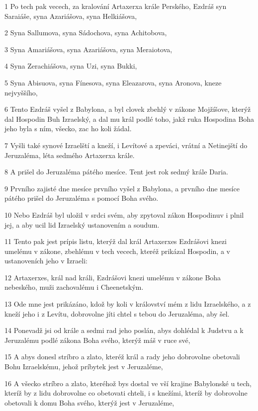 \par 1 Po tech pak vecech, za kralování Artaxerxa krále Perského, Ezdráš syn Saraiáše, syna Azariášova, syna Helkiášova,
\par 2 Syna Sallumova, syna Sádochova, syna Achitobova,
\par 3 Syna Amariášova, syna Azariášova, syna Meraiotova,
\par 4 Syna Zerachiášova, syna Uzi, syna Bukki,
\par 5 Syna Abisuova, syna Fínesova, syna Eleazarova, syna Aronova, kneze nejvyššího,
\par 6 Tento Ezdráš vyšel z Babylona, a byl clovek zbehlý v zákone Mojžíšove, kterýž dal Hospodin Buh Izraelský, a dal mu král podlé toho, jakž ruka Hospodina Boha jeho byla s ním, všecko, zac ho koli žádal.
\par 7 Vyšli také synové Izraelští a kneží, i Levítové a zpeváci, vrátní a Netinejští do Jeruzaléma, léta sedmého Artaxerxa krále.
\par 8 A prišel do Jeruzaléma pátého mesíce. Tent jest rok sedmý krále Daria.
\par 9 Prvního zajisté dne mesíce prvního vyšel z Babylona, a prvního dne mesíce pátého prišel do Jeruzaléma s pomocí Boha svého.
\par 10 Nebo Ezdráš byl uložil v srdci svém, aby zpytoval zákon Hospodinuv i plnil jej, a aby ucil lid Izraelský ustanovením a soudum.
\par 11 Tento pak jest prípis listu, kterýž dal král Artaxerxes Ezdrášovi knezi umelému v zákone, zbehlému v tech vecech, kteréž prikázal Hospodin, a v ustanoveních jeho v Izraeli:
\par 12 Artaxerxes, král nad králi, Ezdrášovi knezi umelému v zákone Boha nebeského, muži zachovalému i Cheenetským.
\par 13 Ode mne jest prikázáno, kdož by koli v království mém z lidu Izraelského, a z kneží jeho i z Levítu, dobrovolne jíti chtel s tebou do Jeruzaléma, aby šel.
\par 14 Ponevadž jsi od krále a sedmi rad jeho poslán, abys dohlédal k Judstvu a k Jeruzalému podlé zákona Boha svého, kterýž máš v ruce své,
\par 15 A abys donesl stríbro a zlato, kteréž král a rady jeho dobrovolne obetovali Bohu Izraelskému, jehož príbytek jest v Jeruzaléme,
\par 16 A všecko stríbro a zlato, kteréhož bys dostal ve vší krajine Babylonské u tech, kteríž by z lidu dobrovolne co obetovati chteli, i s knežími, kteríž by dobrovolne obetovali k domu Boha svého, kterýž jest v Jeruzaléme,
